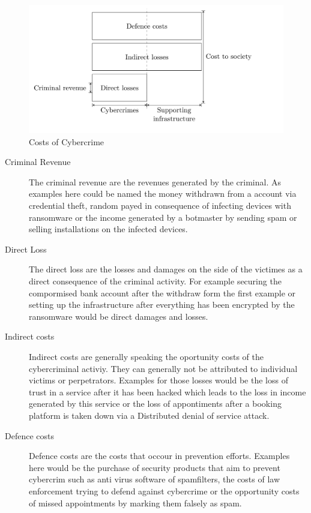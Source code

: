 \begin{figure}[ht]
\begin{center}
\includegraphics[scale=0.25]{Talk11/CostsCybercrime}
\end{center}
\caption{Costs of Cybercrime}
\label{CostsCybercrime}
\end{figure}

\begin{description}
\item[Criminal Revenue] The criminal revenue are the revenues generated by the criminal. As examples here could be named the money withdrawn from a account via credential theft, random payed in consequence of infecting devices with ransomware or the income generated by a botmaster by sending spam or selling installations on the infected devices.  \cite{Anderson19}

\item[Direct Loss] The direct loss are the losses  and damages on the side of the victimes as a direct consequence of the criminal activity. For example securing the compormised bank account after the withdraw form the first example or setting up the infrastructure after everything has been encrypted by the ransomware would be direct damages and losses. \cite{Anderson19}

\item[Indirect costs] Indirect costs are generally speaking the oportunity costs of the cybercriminal activiy. They can generally not be attributed to individual victims or perpetrators. \cite{Netscout19} Examples for those losses would be the loss of trust in a service after it has been hacked which leads to the loss in income generated by this service or the loss of appontiments after a booking platform is taken down via a Distributed denial of service attack. \cite{Anderson19}
 
\item[Defence costs] Defence costs are the costs that occour in prevention efforts. Examples here would be the purchase of security products that aim to prevent cybercrim such as anti virus software of spamfilters, the costs of law enforcement trying to defend against cybercrime or the opportunity costs of missed appointments by marking them falsely as spam. \cite{Anderson19}
\end{description}


